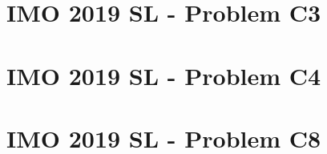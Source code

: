 \documentclass[12pt,openany,oneside]{book}
\theoremstyle{definition}
\numberwithin{exercise}{section}
\numberwithin{definition}{section}
\numberwithin{theorem}{section}
\numberwithin{corollary}{section}
\numberwithin{proposition}{section}
\numberwithin{notation}{section}
\numberwithin{remark}{section}
\numberwithin{hypothesis}{section}
\numberwithin{example}{section}
\begin{document}
\section{IMO 2019 SL - Problem C3}

\section{IMO 2019 SL - Problem C4}

\section{IMO 2019 SL - Problem C8}




\end{document}
